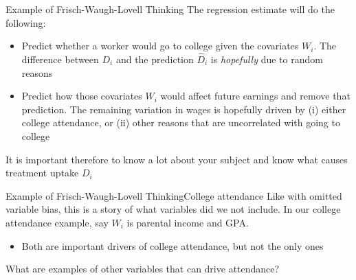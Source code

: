 \documentclass[aspectratio=169,t,11pt,table]{beamer}
\begin{document}
\begin{frame}{Example of Frisch-Waugh-Lovell Thinking}
  The regression estimate will do the following:
  \begin{itemize}
    \item Predict whether a worker would go to college given the covariates $W_i$. The difference between $D_i$ and the prediction $\hat{D}_i$ is \emph{hopefully} due to random reasons
    
    \item Predict how those covariates $W_i$ would affect future earnings and remove that prediction. The remaining variation in wages is hopefully driven by (i) either college attendance, or (ii) other reasons that are uncorrelated with going to college
  \end{itemize}

  \bigskip
  It is important therefore to know a lot about your subject and know what causes treatment uptake $D_i$
\end{frame}

\begin{frame}{Example of Frisch-Waugh-Lovell Thinking}{College attendance}
  Like with omitted variable bias, this is a story of what variables did we not include. In our college attendance example, say $W_i$ is parental income and GPA. 
  \begin{itemize}
    \item Both are important drivers of college attendance, but not the only ones
  \end{itemize}

  \bigskip
  What are examples of other variables that can drive attendance?
\end{frame}



\end{document}
